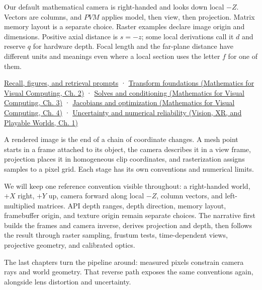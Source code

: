 Our default mathematical camera is right-handed and looks down local \(-Z\). Vectors are columns, and \(PVM\) applies model, then view, then projection. Matrix memory layout is a separate choice. Raster examples declare image origin and dimensions. Positive axial distance is \(s=-z\); some local derivations call it \(d\) and reserve \(q\) for hardware depth. Focal length and the far-plane distance have different units and meanings even where a local section uses the letter \(f\) for one of them.

\hyperref[appendix-a2b71a18f5a2]{Recall, figures, and retrieval prompts} · \href{../02-Mathematics-for-Visual-Computing/main.pdf\#nameddest=01-foundations-i-ch018-keep-the-promises-visible-while-moving-between-representations}{Transform foundations (Mathematics for Visual Computing, Ch. 2)} · \href{../02-Mathematics-for-Visual-Computing/main.pdf\#nameddest=01-foundations-i-ch019-the-graphics-problem-hiding-inside-a-matrix-equation}{Solves and conditioning (Mathematics for Visual Computing, Ch. 3)} · \href{../02-Mathematics-for-Visual-Computing/main.pdf\#nameddest=01-foundations-i-ch020-functions-limits-continuity-and-scalar-change}{Jacobians and optimization (Mathematics for Visual Computing, Ch. 4)} · \href{../07-Vision-XR-and-Playable-Worlds/main.pdf\#nameddest=02-foundations-ii-ch039-learning-route}{Uncertainty and numerical reliability (Vision, XR, and Playable Worlds, Ch. 1)}

A rendered image is the end of a chain of coordinate changes. A mesh point starts in a frame attached to its object, the camera describes it in a view frame, projection places it in homogeneous clip coordinates, and rasterization assigns samples to a pixel grid. Each stage has its own conventions and numerical limits.

We will keep one reference convention visible throughout: a right-handed world, \(+X\) right, \(+Y\) up, camera forward along local \(-Z\), column vectors, and left-multiplied matrices. API depth ranges, depth direction, memory layout, framebuffer origin, and texture origin remain separate choices. The narrative first builds the frames and camera inverse, derives projection and depth, then follows the result through raster sampling, frustum tests, time-dependent views, projective geometry, and calibrated optics.

The last chapters turn the pipeline around: measured pixels constrain camera rays and world geometry. That reverse path exposes the same conventions again, alongside lens distortion and uncertainty.

